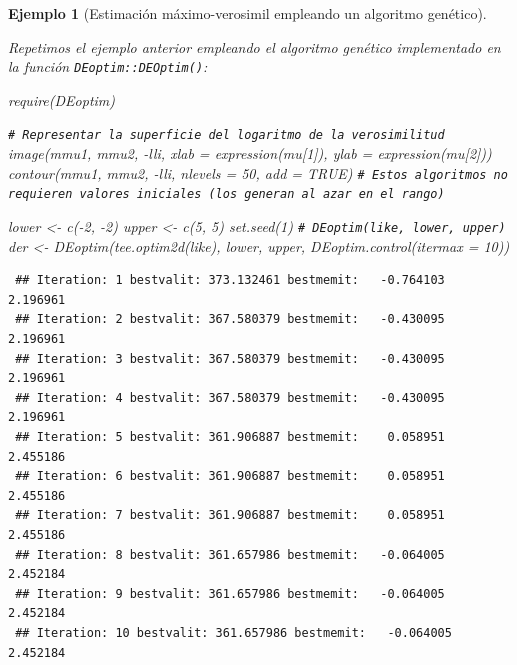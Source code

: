 \documentclass[
]{book}
\newenvironment{Shaded}{\begin{snugshade}}{\end{snugshade}}
\newcommand{\AttributeTok}[1]{\textcolor[rgb]{0.77,0.63,0.00}{#1}}
\newcommand{\CommentTok}[1]{\textcolor[rgb]{0.56,0.35,0.01}{\textit{#1}}}
\newcommand{\ConstantTok}[1]{\textcolor[rgb]{0.00,0.00,0.00}{#1}}
\newcommand{\DecValTok}[1]{\textcolor[rgb]{0.00,0.00,0.81}{#1}}
\newcommand{\FunctionTok}[1]{\textcolor[rgb]{0.00,0.00,0.00}{#1}}
\newcommand{\NormalTok}[1]{#1}
\newcommand{\OtherTok}[1]{\textcolor[rgb]{0.56,0.35,0.01}{#1}}
\newcommand{\SpecialCharTok}[1]{\textcolor[rgb]{0.00,0.00,0.00}{#1}}
\theoremstyle{break}
\newtheorem{example}{Ejemplo}[chapter]
\theoremstyle{nonumberplain}
\renewcommand{\CommentTok}[1]{\textcolor[rgb]{0.41,0.41,0.41}{\texttt{#1}}}
\begin{document}
\begin{example}[Estimación máximo-verosimil empleando un algoritmo genético]
\protect\hypertarget{exm:mv-DEoptim}{}\label{exm:mv-DEoptim}

Repetimos el ejemplo anterior empleando el algoritmo genético implementado en la función \texttt{DEoptim::DEOptim()}:

\begin{Shaded}
\begin{Highlighting}[]
\FunctionTok{require}\NormalTok{(DEoptim)}

\CommentTok{\# Representar la superficie del logaritmo de la verosimilitud}
\FunctionTok{image}\NormalTok{(mmu1, mmu2, }\SpecialCharTok{{-}}\NormalTok{lli, }\AttributeTok{xlab =} \FunctionTok{expression}\NormalTok{(mu[}\DecValTok{1}\NormalTok{]), }\AttributeTok{ylab =} \FunctionTok{expression}\NormalTok{(mu[}\DecValTok{2}\NormalTok{]))}
\FunctionTok{contour}\NormalTok{(mmu1, mmu2, }\SpecialCharTok{{-}}\NormalTok{lli, }\AttributeTok{nlevels =} \DecValTok{50}\NormalTok{, }\AttributeTok{add =} \ConstantTok{TRUE}\NormalTok{)}
\CommentTok{\# Estos algoritmos no requieren valores iniciales (los generan al azar en el rango)}

\NormalTok{lower }\OtherTok{\textless{}{-}} \FunctionTok{c}\NormalTok{(}\SpecialCharTok{{-}}\DecValTok{2}\NormalTok{, }\SpecialCharTok{{-}}\DecValTok{2}\NormalTok{)}
\NormalTok{upper }\OtherTok{\textless{}{-}} \FunctionTok{c}\NormalTok{(}\DecValTok{5}\NormalTok{, }\DecValTok{5}\NormalTok{)}
\FunctionTok{set.seed}\NormalTok{(}\DecValTok{1}\NormalTok{)}
\CommentTok{\# DEoptim(like, lower, upper)}
\NormalTok{der }\OtherTok{\textless{}{-}} \FunctionTok{DEoptim}\NormalTok{(}\FunctionTok{tee.optim2d}\NormalTok{(like), lower, upper, }\FunctionTok{DEoptim.control}\NormalTok{(}\AttributeTok{itermax =} \DecValTok{10}\NormalTok{))}
\end{Highlighting}
\end{Shaded}

\begin{verbatim}
 ## Iteration: 1 bestvalit: 373.132461 bestmemit:   -0.764103    2.196961
 ## Iteration: 2 bestvalit: 367.580379 bestmemit:   -0.430095    2.196961
 ## Iteration: 3 bestvalit: 367.580379 bestmemit:   -0.430095    2.196961
 ## Iteration: 4 bestvalit: 367.580379 bestmemit:   -0.430095    2.196961
 ## Iteration: 5 bestvalit: 361.906887 bestmemit:    0.058951    2.455186
 ## Iteration: 6 bestvalit: 361.906887 bestmemit:    0.058951    2.455186
 ## Iteration: 7 bestvalit: 361.906887 bestmemit:    0.058951    2.455186
 ## Iteration: 8 bestvalit: 361.657986 bestmemit:   -0.064005    2.452184
 ## Iteration: 9 bestvalit: 361.657986 bestmemit:   -0.064005    2.452184
 ## Iteration: 10 bestvalit: 361.657986 bestmemit:   -0.064005    2.452184
\end{verbatim}


\end{example}
\end{document}
